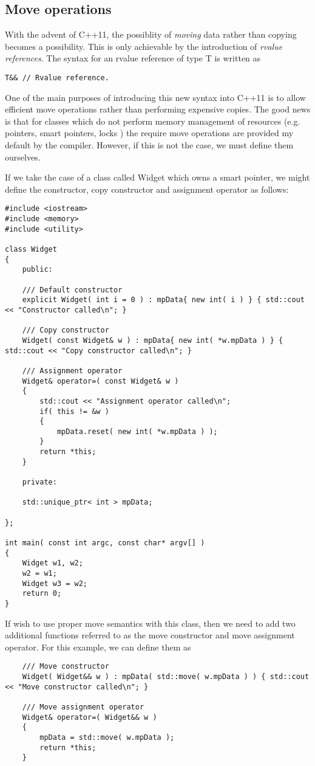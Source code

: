 \subsection{Move operations}
\label{sec:move-operations}

With the advent of C++11, the possiblity of \textit{moving} data
rather than copying becomes a possibility. This is only achievable by
the introduction of \textit{rvalue references}. The syntax for an rvalue reference of type T is written as
\begin{verbatim}
T&& // Rvalue reference. 
\end{verbatim}

One of the main purposes of introducing this new syntax into C++11 is to allow efficient move operations rather than performing expensive copies. The good news is that for classes which do not perform memory management of resources (e.g. pointers, smart pointers, locks ) the require move operations are provided my default by the compiler. However, if this is not the case, we must define them ourselves. 

If we take the case of a class called Widget which owns a smart pointer, we might define the constructor, copy constructor and assignment operator as follows:
\begin{lstlisting}
#include <iostream>
#include <memory>
#include <utility>

class Widget
{
	public:

	/// Default constructor
	explicit Widget( int i = 0 ) : mpData{ new int( i ) } { std::cout << "Constructor called\n"; }

	/// Copy constructor
	Widget( const Widget& w ) : mpData{ new int( *w.mpData ) } { std::cout << "Copy constructor called\n"; }

	/// Assignment operator
	Widget& operator=( const Widget& w )
	{
		std::cout << "Assignment operator called\n";
		if( this != &w )
		{
			mpData.reset( new int( *w.mpData ) );
		}
		return *this;
	}
	
	private:

	std::unique_ptr< int > mpData;
	
};

int main( const int argc, const char* argv[] )
{
	Widget w1, w2;
	w2 = w1;
	Widget w3 = w2;
	return 0;
}
\end{lstlisting}

If wish to use proper move semantics with this class, then we need to add two additional functions referred to as the move constructor and move assignment operator. For this example, we can define them as
\begin{lstlisting}
	/// Move constructor
	Widget( Widget&& w ) : mpData( std::move( w.mpData ) ) { std::cout << "Move constructor called\n"; }

	/// Move assignment operator
	Widget& operator=( Widget&& w )
	{
		mpData = std::move( w.mpData );
		return *this;
	}
\end{lstlisting}

